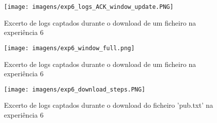 \begin{figure}[h!]
\centering
\texttt{[image: imagens/exp6\_logs\_ACK\_window\_update.PNG]}
\caption{Excerto de logs captados durante o download de um ficheiro na experiência 6}
\label{fig:exp6_logs_ACK_window_update}
\end{figure}

\begin{figure}[h!]
\centering
\texttt{[image: imagens/exp6\_window\_full.png]}
\caption{Excerto de logs captados durante o download de um ficheiro na experiência 6}
\label{fig:exp6_window_full}
\end{figure}

\begin{figure}[h!]
\centering
\texttt{[image: imagens/exp6\_download\_steps.PNG]}
\caption{Excerto de logs captados durante o download do ficheiro 'pub.txt' na experiência 6}
\label{fig:exp6_download_steps}
\end{figure}
